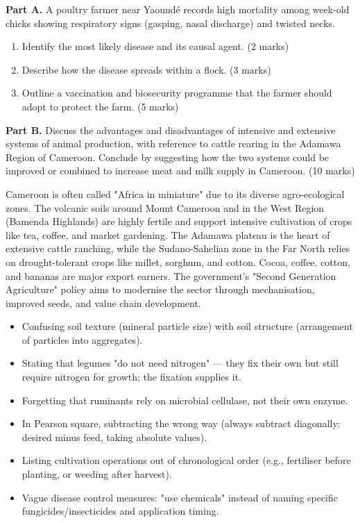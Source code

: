 \documentclass[11pt]{article}
\begin{document}
\begin{exercice}
\textbf{Part A.} A poultry farmer near Yaoundé records high mortality among week-old chicks showing respiratory signs (gasping, nasal discharge) and twisted necks.
\begin{enumerate}
\item Identify the most likely disease and its causal agent. \hfill (2 marks)
\item Describe how the disease spreads within a flock. \hfill (3 marks)
\item Outline a vaccination and biosecurity programme that the farmer should adopt to protect the farm. \hfill (5 marks)
\end{enumerate}
\textbf{Part B.} Discuss the advantages and disadvantages of intensive and extensive systems of animal production, with reference to cattle rearing in the Adamawa Region of Cameroon. Conclude by suggesting how the two systems could be improved or combined to increase meat and milk supply in Cameroon. \hfill (10 marks)
\end{exercice}

\begin{savaistu}
Cameroon is often called "Africa in miniature" due to its diverse agro-ecological zones. The volcanic soils around Mount Cameroon and in the West Region (Bamenda Highlands) are highly fertile and support intensive cultivation of crops like tea, coffee, and market gardening. The Adamawa plateau is the heart of extensive cattle ranching, while the Sudano-Sahelian zone in the Far North relies on drought-tolerant crops like millet, sorghum, and cotton. Cocoa, coffee, cotton, and bananas are major export earners. The government's "Second Generation Agriculture" policy aims to modernise the sector through mechanisation, improved seeds, and value chain development.
\end{savaistu}

\begin{attention}
\begin{itemize}
\item Confusing soil texture (mineral particle size) with soil structure (arrangement of particles into aggregates).
\item Stating that legumes "do not need nitrogen" — they fix their own but still require nitrogen for growth; the fixation supplies it.
\item Forgetting that ruminants rely on microbial cellulase, not their own enzyme.
\item In Pearson square, subtracting the wrong way (always subtract diagonally: desired minus feed, taking absolute values).
\item Listing cultivation operations out of chronological order (e.g., fertiliser before planting, or weeding after harvest).
\item Vague disease control measures: "use chemicals" instead of naming specific fungicides/insecticides and application timing.
\end{itemize}
\end{attention}
\end{document}
